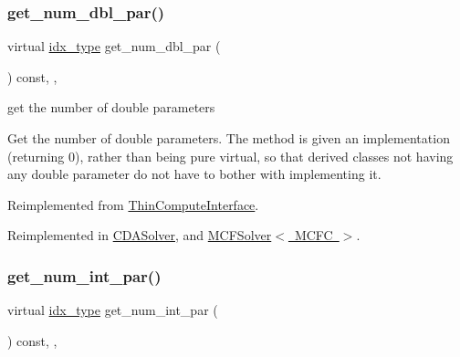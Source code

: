 \subsubsection{\texorpdfstring{get\+\_\+num\+\_\+dbl\+\_\+par()}{get\_num\_dbl\_par()}}
{\footnotesize\ttfamily virtual \mbox{\hyperlink{class_s_m_spp__di__unipi__it_1_1_thin_compute_interface_aa3d710629ad8c434286726ad810c3b47}{idx\+\_\+type}} get\+\_\+num\+\_\+dbl\+\_\+par (\begin{DoxyParamCaption}\item[{void}]{ }\end{DoxyParamCaption}) const\hspace{0.3cm}{\ttfamily [inline]}, {\ttfamily [override]}, {\ttfamily [virtual]}}



get the number of double parameters 

Get the number of double parameters. The method is given an implementation (returning 0), rather than being pure virtual, so that derived classes not having any double parameter do not have to bother with implementing it. 

Reimplemented from \mbox{\hyperlink{class_s_m_spp__di__unipi__it_1_1_thin_compute_interface_a03d2492bc7caa7e7821fa1bc4f06a36e}{Thin\+Compute\+Interface}}.



Reimplemented in \mbox{\hyperlink{class_s_m_spp__di__unipi__it_1_1_c_d_a_solver_a842fd454acaded84baf6b77e0d61a950}{C\+D\+A\+Solver}}, and \mbox{\hyperlink{class_s_m_spp__di__unipi__it_1_1_m_c_f_solver_a842fd454acaded84baf6b77e0d61a950}{M\+C\+F\+Solver$<$ M\+C\+F\+C $>$}}.

\mbox{\label{class_s_m_spp__di__unipi__it_1_1_solver_a3ad74d9506761eb2ca4c8a936fb7a1c5}} 
\subsubsection{\texorpdfstring{get\+\_\+num\+\_\+int\+\_\+par()}{get\_num\_int\_par()}}
{\footnotesize\ttfamily virtual \mbox{\hyperlink{class_s_m_spp__di__unipi__it_1_1_thin_compute_interface_aa3d710629ad8c434286726ad810c3b47}{idx\+\_\+type}} get\+\_\+num\+\_\+int\+\_\+par (\begin{DoxyParamCaption}\item[{void}]{ }\end{DoxyParamCaption}) const\hspace{0.3cm}{\ttfamily [inline]}, {\ttfamily [override]}, {\ttfamily [virtual]}}



